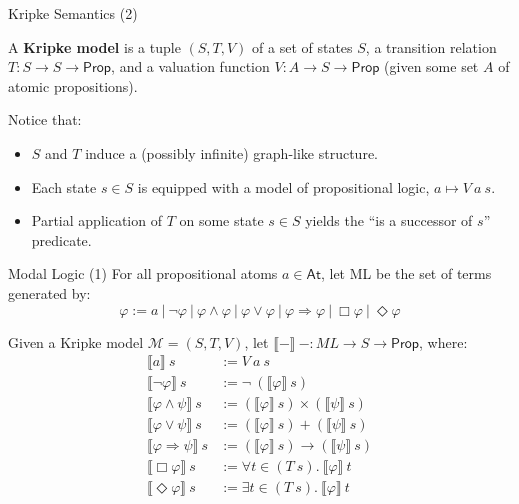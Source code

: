 \documentclass[aspectratio=169]{beamer}
\newcommand{\meaningof}[1]{\ensuremath{\llbracket #1 \rrbracket}}
\begin{document}
\begin{frame}{Kripke Semantics (2)}

\begin{definition}
  A \textbf{Kripke model} is a tuple $(S,T,V)$ of a set of states $S$, a transition relation $T : S \to S \to \mathsf{Prop}$, and a valuation function $V : A \to S \to \mathsf{Prop}$ (given some set $A$ of atomic propositions).
\end{definition}

\bigskip

Notice that:
\begin{itemize}
  \item $S$ and $T$ induce a (possibly infinite) graph-like structure.
        \smallskip
  \item Each state $s \in S$ is equipped with a model of propositional logic, $a \mapsto V~a~s$.
        \smallskip
  \item Partial application of $T$ on some state $s \in S$ yields the ``is a successor of $s$'' predicate.
\end{itemize}

\end{frame}

\begin{frame}{Modal Logic (1)}
  For all propositional atoms $a \in \mathsf{At}$, let ML be the set of terms generated by:
  \begin{equation*}
    \varphi := a~|~\neg \varphi~|~\varphi \land \varphi~|~\varphi \lor \varphi~|~\varphi \Rightarrow \varphi~|~\Box \varphi~|~\Diamond \varphi
  \end{equation*}

  \bigskip

  Given a Kripke model $\mathcal{M} = (S,T,V)$, let $\meaningof{-}~- : ML \to S \to \mathsf{Prop}$, where:
  \begin{align*}
    \meaningof{a}~s &:= V~a~s \\
    \meaningof{\lnot \varphi}~s &:= \lnot~(\meaningof{\varphi}~s) \\
    \meaningof{\varphi \land \psi}~s &:= (\meaningof{\varphi}~s) \times (\meaningof{\psi}~s) \\
    \meaningof{\varphi \lor \psi}~s &:= (\meaningof{\varphi}~s) + (\meaningof{\psi}~s) \\
    \meaningof{\varphi \Rightarrow \psi}~s &:= (\meaningof{\varphi}~s) \to (\meaningof{\psi}~s) \\
    \meaningof{\Box \varphi}~s &:= \forall t \in (T~s).~\meaningof{\varphi}~t \\
    \meaningof{\Diamond \varphi}~s &:= \exists t \in (T~s).~\meaningof{\varphi}~t
  \end{align*}
\end{frame}
\end{document}
